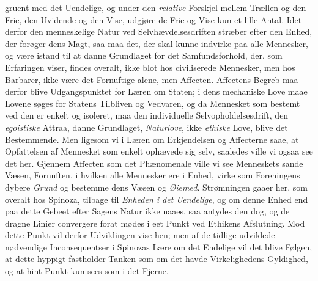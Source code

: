 \documentclass[12pt,a4paper]{book}
\newcommand{\opage}[1]{\marginnote{\footnotesize\textit{[#1]}}}
\begin{document}
\opage{133}gruent med det Uendelige, og under den \emph{relative} Forskjel mellem Trællen og den Frie, den Uvidende og den Vise, udgjøre de Frie og Vise kun et lille Antal. Idet derfor den menneskelige Natur ved Selvhævdelsesdriften stræber efter den Enhed, der forøger dens Magt, saa maa det, der skal kunne indvirke paa alle Mennesker, og være istand til at danne Grundlaget for det Samfundsforhold, der, som Erfaringen viser, findes overalt, ikke blot hos civiliserede Mennesker, men hos Barbarer, ikke være det Fornuftige alene, men Affecten. Affectens Begreb maa derfor blive Udgangspunktet for Læren om Staten; i dens mechaniske Love maae Lovene søges for Statens Tilbliven og Vedvaren, og da Mennesket som bestemt ved den er enkelt og isoleret, maa den individuelle Selvopholdelsesdrift, den \emph{egoistiske} Attraa, danne Grundlaget, \emph{Naturlove}, ikke \emph{ethiske} Love, blive det Bestemmende. Men ligesom vi i Læren om Erkjendelsen og Affecterne saae, at Opfattelsen af Mennesket som enkelt ophævede sig selv, saaledes ville vi ogsaa see det her. Gjennem Affecten som det Phænomenale ville vi see Menneskets sande Væsen, Fornuften, i hvilken alle Mennesker ere i Enhed, virke som Foreningens dybere \emph{Grund} og bestemme dens Væsen og \emph{Øiemed}. Strømningen gaaer her, som overalt hos Spinoza, tilbage til \emph{Enheden i det Uendelige}, og om denne Enhed end paa dette Gebeet efter Sagens Natur ikke naaes, saa antydes den dog, og de dragne Linier convergere forat mødes i eet Punkt ved Ethikens Afslutning. Mod dette Punkt vil derfor Udviklingen vise hen; men af de tidlige udviklede nødvendige Inconsequentser i Spinozas Lære om det Endelige vil det blive Følgen, at dette hyppigt fastholder Tanken som om det havde Virkelighedens Gyldighed, og at hint Punkt kun sees som i det Fjerne.
\end{document}

